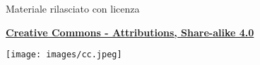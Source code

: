 \documentclass{beamer}
\begin{document}
\begin{frame}

\begin{center}
	\bigskip
	Materiale rilasciato con licenza
	
	\textbf{\href{http://creativecommons.org/licenses/by-sa/4.0/}{Creative Commons - Attributions, Share-alike 4.0}}
	
	\medskip
	\texttt{[image: images/cc.jpeg]}
\end{center}

\end{frame}
	
\end{document}
